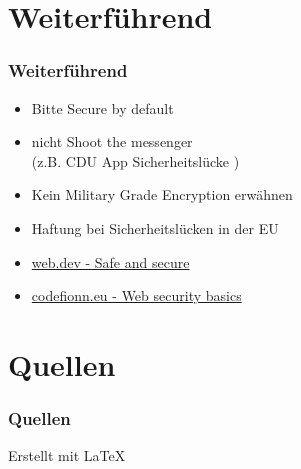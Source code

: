 \documentclass[ngerman2]{beamer}
\begin{document}
\section{Weiterführend}

\begin{frame}
\frametitle{Weiterführend}
  \begin{itemize}
    \item Bitte Secure by default
    \item nicht Shoot the messenger\\
      (z.B. CDU App Sicherheitslücke \cite{csuapp})
    \item Kein Military Grade Encryption erwähnen
    \item Haftung bei Sicherheitslücken in der EU \cite{eusechaftung}
    \item \href{https://web.dev/secure/}{web.dev - Safe and secure}
    \item \href{https://codefionn.eu/web-security-basics/}{codefionn.eu - Web security basics}
  \end{itemize}
\end{frame}

\section{Quellen}

\begin{frame}[allowframebreaks]
\frametitle{Quellen}
  \printbibliography
  \small{Erstellt mit \LaTeX}
\end{frame}
\end{document}
